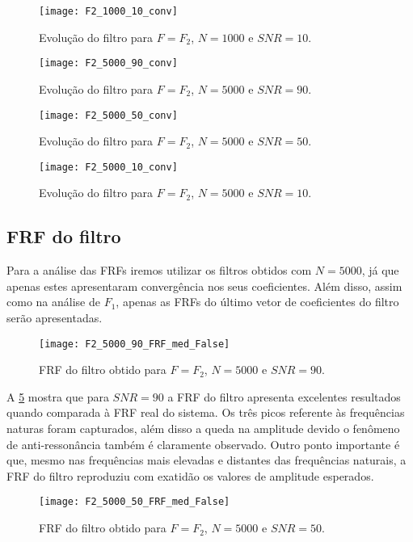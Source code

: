 \begin{figure}
	\centering
	\texttt{[image: F2\_1000\_10\_conv]}
	\caption{Evolução do filtro para $ F=F_2 $, $ N=1000 $ e $ SNR=10 $.}
	\label{fig:F2_1000_10_conv}
\end{figure}

\begin{figure}
	\centering
	\texttt{[image: F2\_5000\_90\_conv]}
	\caption{Evolução do filtro para $ F=F_2 $, $ N=5000 $ e $ SNR=90 $.}
	\label{fig:F2_5000_90_conv}
\end{figure}

\begin{figure}
	\centering
	\texttt{[image: F2\_5000\_50\_conv]}
	\caption{Evolução do filtro para $ F=F_2 $, $ N=5000 $ e $ SNR=50 $.}
	\label{fig:F2_5000_50_conv}
\end{figure}

\begin{figure}
	\centering
	\texttt{[image: F2\_5000\_10\_conv]}
	\caption{Evolução do filtro para $ F=F_2 $, $ N=5000 $ e $ SNR=10 $.}
	\label{fig:F2_5000_10_conv}
\end{figure}

\subsection{FRF do filtro}
Para a análise das FRFs iremos utilizar os filtros obtidos com $ N=5000 $, já que apenas estes apresentaram convergência nos seus coeficientes. Além disso, assim como na análise de $ F_1 $, apenas as FRFs do último vetor de coeficientes do filtro serão apresentadas.

\begin{figure}
	\centering
	\texttt{[image: F2\_5000\_90\_FRF\_med\_False]}
	\caption{FRF do filtro obtido para $ F=F_2 $, $ N=5000 $ e $ SNR=90 $.}
	\label{fig:F2_5000_90_FRF_med_False}
\end{figure}

A \cref{fig:F2_5000_90_FRF_med_False} mostra que para $ SNR=90 $ a FRF do filtro apresenta excelentes resultados quando comparada à FRF real do sistema. Os três picos referente às frequências naturas foram capturados, além disso a queda na amplitude devido o fenômeno de anti-ressonância também é claramente observado. Outro ponto importante é que, mesmo nas frequências mais elevadas e distantes das frequências naturais, a FRF do filtro reproduziu com exatidão os valores de amplitude esperados.

\begin{figure}
	\centering
	\texttt{[image: F2\_5000\_50\_FRF\_med\_False]}
	\caption{FRF do filtro obtido para $ F=F_2 $, $ N=5000 $ e $ SNR=50 $.}
	\label{fig:F2_5000_50_FRF_med_False}
\end{figure}


